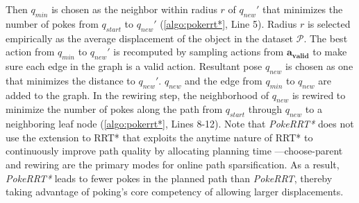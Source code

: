Then $q_{min}$ is chosen as the neighbor within radius $r$ of $q_{new}'$ that minimizes the number of pokes from $q_{start}$ to $q_{new}'$ (\cref{algo:pokerrt*}, Line 5). Radius $r$ is selected empirically as the average displacement of the object in the dataset $\mathcal{P}$.
The best action from $q_{min}$ to $q_{new}'$ is recomputed by sampling actions from $\boldsymbol{a_{valid}}$ to make sure each edge in the graph is a valid action. Resultant pose $q_{new}$ is chosen as one that minimizes the distance to $q_{new}'$. $q_{new}$ and the edge from $q_{min}$ to $q_{new}$ are added to the graph.
In the rewiring step, the neighborhood of $q_{new}$ is rewired to minimize the number of pokes along the path from $q_{start}$ through $q_{new}$ to a neighboring leaf node (\cref{algo:pokerrt*}, Lines 8-12). Note that \textsl{PokeRRT*} does not use the extension to RRT* that exploits the anytime nature of RRT* to continuously improve path quality by allocating planning time \cite{karaman2011anytime}---choose-parent and rewiring are the primary modes for online path sparsification.
As a result, \textsl{PokeRRT*} leads to fewer pokes in the planned path than \textsl{PokeRRT}, thereby taking advantage of poking's core competency of allowing larger displacements.



